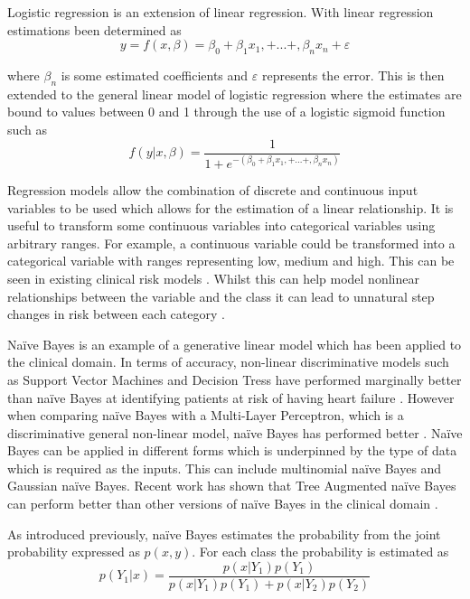 \documentclass[a4paper,UKenglish]{oasics-v2016}
\begin{document}
Logistic regression is an extension of linear regression. With linear regression estimations been determined as
\begin{equation}
y = f(x,\beta) = \beta_0 + \beta_1 x_1, + ... +, \beta_n x_n + \varepsilon 
\end{equation}

where $\beta_n$ is some estimated coefficients and $\varepsilon$ represents the error. This is then extended to the general linear model of logistic regression where the estimates are bound to values between 0 and 1 through the use of a logistic sigmoid function such as
\begin{equation}
f(y|x,\beta) = \frac{1}{1 + e^{-(\beta_0 + \beta_1 x_1, + ... +, \beta_n x_n)}}
\end{equation}


Regression models allow the combination of discrete and continuous input variables to be used which allows for the estimation of a linear relationship. It is useful to transform some continuous variables into categorical variables using arbitrary ranges. For example, a continuous variable could be transformed into a categorical variable with ranges representing low, medium and high. This can be seen in existing clinical risk models \cite{Wilson1998}\cite{Pocock2013}.  Whilst this can help model nonlinear relationships between the variable and the class it can lead to unnatural step changes in risk between each category \cite{Steyerberg2009}.

Naïve Bayes is an example of a generative linear model which has been applied to the clinical domain. In terms of accuracy, non-linear discriminative models such as Support Vector Machines and Decision Tress have performed marginally better than naïve Bayes at identifying patients at risk of having heart failure \cite{Alizadehsani2012}\cite{Palaniappan2008}. However when comparing naïve Bayes with a Multi-Layer Perceptron, which is a discriminative general non-linear model, naïve Bayes has performed better \cite{Palaniappan2008}. Naïve Bayes can be applied in different forms which is underpinned by the type of data which is required as the inputs. This can include multinomial naïve Bayes and Gaussian naïve Bayes. Recent work has shown that Tree Augmented naïve Bayes can perform better than other versions of naïve Bayes in the clinical domain \cite{Moore2014}.

As introduced previously, naïve Bayes estimates the probability from the joint probability expressed as $p(x,y)$. For each class the probability is estimated as
\begin{equation}
p(Y_1|x) = \frac {p(x|Y_1)p(Y_1)} { p(x|Y_1)p(Y_1) + p(x|Y_2)p(Y_2) }
\end{equation}
\end{document}
